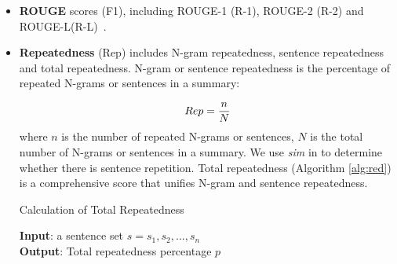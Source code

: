 \begin{itemize}

\item \textbf{ROUGE} scores (F1), including ROUGE-1 (R-1), ROUGE-2 (R-2) and
ROUGE-L(R-L)~\cite{rouge-a-package-for-automatic-evaluation-of-summaries}.

\item \textbf{Repeatedness} (Rep) includes N-gram repeatedness, sentence repeatedness
and total repeatedness. 
N-gram or sentence repeatedness is the percentage of repeated N-grams 
or sentences in a summary:

\begin{equation}
\small Rep = \frac{n}{N}
\end{equation}
where $n$ is the number of repeated N-grams or sentences, 
$N$ is the total number of N-grams or sentences in a summary.
We use \textit{sim} in  to %
determine whether there is sentence repetition.
Total repeatedness (Algorithm \ref{alg:red}) is a comprehensive score that unifies N-gram and sentence repeatedness.
\begin{algorithm}[th]
\caption{Calculation of Total Repeatedness}
\scriptsize
\label{alg:red}
\textbf{Input}: a sentence set $s = {s_{1}, s_{2},...,s_{n}}$\\
\textbf{Output}: Total repeatedness percentage $p$
\begin{algorithmic}[1] %

\end{algorithmic}
\end{algorithm}
\end{itemize}
